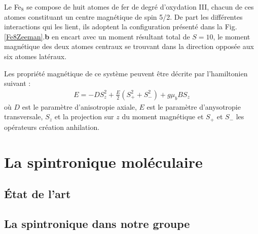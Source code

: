 Le Fe$_8$ se compose de huit atomes de fer de degré d'oxydation III, chacun de ces atomes constituant un centre magnétique de spin 5/2. De part les différentes interactions qui les lient, ils adoptent la configuration présenté dans la Fig.\ref{Fe8Zeeman}.\textbf{b} en encart avec un moment résultant total de $S=10$, le moment magnétique des deux atomes centraux se trouvant dans la direction opposée aux six atomes latéraux.

Les propriété magnétique de ce système peuvent \^etre décrite par l'hamiltonien suivant :
\begin{eqnarray}
E =  -DS_z^2 + \frac{E}{2} ( S_+^2  + S_-^2) + g\mu_b B S_z 
\end{eqnarray}
où $D$ est le paramètre d'anisotropie axiale, $E$ est le paramètre d'anysotropie transversale, $S_z$ et la projection sur $z$ du moment magnétique et $S_+$ et $S_-$ les opérateurs création anhilation.

\section{La spintronique moléculaire}
\subsection{État de l'art}
\subsection{La spintronique dans notre groupe}